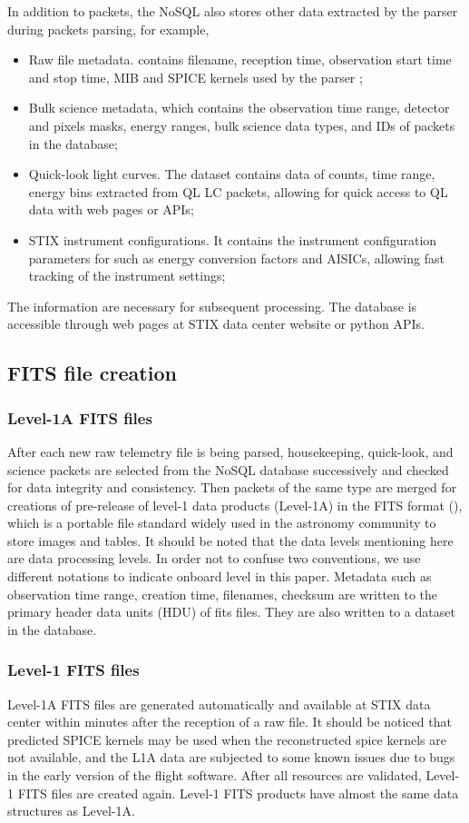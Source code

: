 \documentclass[referee]{aa} %
\begin{document}
In addition to packets, the NoSQL also stores other data extracted by the parser during packets parsing, 
for example, 
\begin{itemize}
  \item Raw file metadata. contains filename, reception time, observation start time and stop time, MIB and SPICE kernels used by the parser ; 
  \item Bulk science metadata, which contains the observation time range, detector and pixels masks, energy ranges, 
   bulk science data types, and IDs of packets in the database; 
  \item Quick-look light curves.  The dataset contains data of counts, time range, energy bins extracted from QL LC packets, 
     allowing for  quick access to QL data with web pages or APIs;
  \item STIX instrument configurations. 
  It contains the instrument configuration parameters for such as  energy conversion factors and AISICs, 
  allowing fast tracking of the instrument settings;
\end{itemize}
The information are necessary for subsequent processing. The
database is  accessible through web pages at STIX data center website or python APIs. 
\subsection{FITS file creation}
\subsubsection{Level-1A FITS files}
After each new raw telemetry file is being parsed, 
housekeeping, quick-look, and science packets  
are selected from the NoSQL database successively 
and checked for data integrity and consistency. 
Then packets of the same type are merged for creations of pre-release of 
level-1 data products (Level-1A)
 in the FITS format (\cite{fits}), 
which is a portable file standard widely used in the astronomy 
community to store images and tables.
It should be noted that the data levels mentioning here are data processing levels. 
In order not to confuse two conventions, we use different notations to indicate onboard level in this paper. 
Metadata such as observation time range, creation time, filenames,  checksum are written to 
the primary header data units (HDU) of fits files. 
They are also written to a dataset in the database.

\subsubsection{Level-1 FITS files}
Level-1A FITS files are generated automatically and available at STIX data center within minutes 
after the reception of a raw file.
It should be noticed that predicted SPICE kernels may be used when the reconstructed spice kernels  
are not available, and the L1A data are subjected to some known issues 
due to bugs in the early version of the flight software.
After all resources are validated,  Level-1  FITS files are created again. 
Level-1  FITS products have almost the same data structures as Level-1A.
\end{document}
